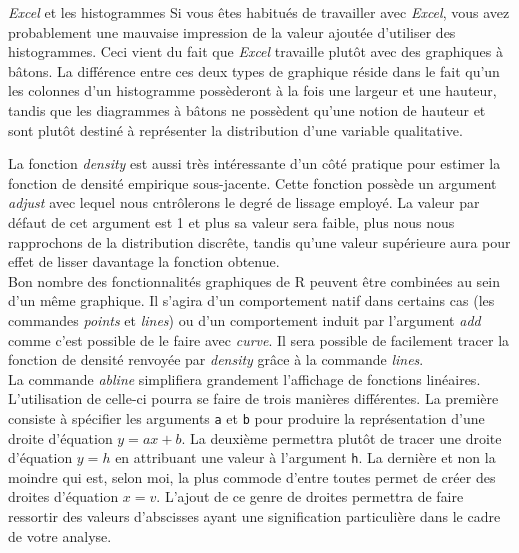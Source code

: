 \begin{moreInfo}{\emph{Excel} et les histogrammes}
	Si vous êtes habitués de travailler avec \emph{Excel}, vous avez probablement une mauvaise impression de la valeur ajoutée d'utiliser des histogrammes. Ceci vient du fait que \emph{Excel} travaille plutôt avec des graphiques à bâtons. La différence entre ces deux types de graphique réside dans le fait qu'un les colonnes d'un histogramme possèderont à la fois une largeur et une hauteur, tandis que les diagrammes à bâtons ne possèdent qu'une notion de hauteur et sont plutôt destiné à représenter la distribution d'une variable qualitative. 
\end{moreInfo}

\noindent
La fonction \emph{density} est aussi très intéressante d'un côté pratique pour estimer la fonction de densité empirique sous-jacente. Cette fonction possède un argument \emph{adjust} avec lequel nous cntrôlerons le degré de lissage employé. La valeur par défaut de cet argument est 1 et plus sa valeur sera faible, plus nous nous rapprochons de la distribution discrête, tandis qu'une valeur supérieure aura pour effet de lisser davantage la fonction obtenue. \\

\noindent
Bon nombre des fonctionnalités graphiques de R peuvent être combinées au sein d'un même graphique. Il s'agira d'un comportement natif dans certains cas (les commandes \emph{points} et \emph{lines}) ou d'un comportement induit par l'argument \emph{add} comme c'est possible de le faire avec \emph{curve}. Il sera possible de facilement tracer la fonction de densité renvoyée par \emph{density} grâce à la commande \emph{lines}. \\

\noindent
La commande \emph{abline} simplifiera grandement l'affichage de fonctions linéaires. L'utilisation de celle-ci pourra se faire de trois manières différentes. La première consiste à spécifier les arguments \texttt{a} et \texttt{b} pour produire la représentation d'une droite d'équation $y = ax + b$. La deuxième permettra plutôt de tracer une droite d'équation $y = h$ en attribuant une valeur à l'argument \texttt{h}. La dernière et non la moindre qui est, selon moi, la plus commode d'entre toutes permet de créer des droites d'équation $x = v$. L'ajout de ce genre de droites permettra de faire ressortir des valeurs d'abscisses ayant une signification particulière dans le cadre de votre analyse. \\

